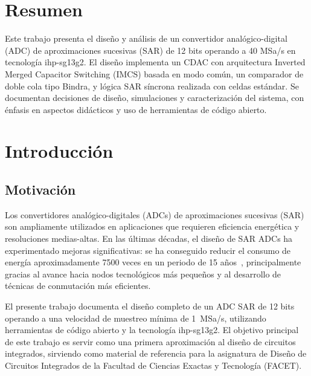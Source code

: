 \documentclass[12pt,a4paper]{report}
\begin{document}
\newpage
\chapter*{Resumen}
Este trabajo presenta el diseño y análisis de un convertidor analógico-digital (ADC) de aproximaciones sucesivas (SAR) de 12 bits operando a 40 MSa/s en tecnología ihp-sg13g2. El diseño implementa un CDAC con arquitectura Inverted Merged Capacitor Switching (IMCS) basada en modo común, un comparador de doble cola tipo Bindra, y lógica SAR síncrona realizada con celdas estándar. Se documentan decisiones de diseño, simulaciones y caracterización del sistema, con énfasis en aspectos didácticos y uso de herramientas de código abierto.

\tableofcontents
\newpage

\chapter{Introducción}

\section{Motivación}

Los convertidores analógico-digitales (ADCs) de aproximaciones sucesivas (SAR) son ampliamente utilizados en aplicaciones que requieren eficiencia energética y resoluciones medias-altas. En las últimas décadas, el diseño de SAR ADCs ha experimentado mejoras significativas: se ha conseguido reducir el consumo de energía aproximadamente 7500 veces en un periodo de 15 años~\cite{lowpower_survey}, principalmente gracias al avance hacia nodos tecnológicos más pequeños y al desarrollo de técnicas de conmutación más eficientes.

El presente trabajo documenta el diseño completo de un ADC SAR de 12 bits operando a una velocidad de muestreo mínima de 1~MSa/s, utilizando herramientas de código abierto y la tecnología ihp-sg13g2. El objetivo principal de este trabajo es servir como una primera aproximación al diseño de circuitos integrados, sirviendo como material de referencia para la asignatura de Diseño de Circuitos Integrados de la Facultad de Ciencias Exactas y Tecnología (FACET). 
\end{document}
